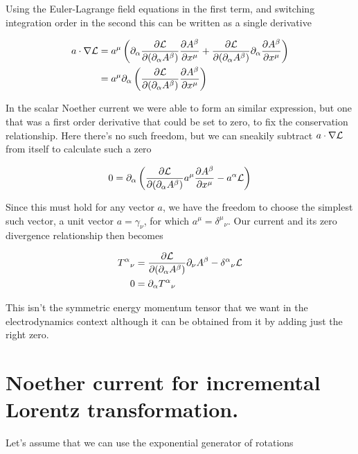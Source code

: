 Using the Euler-Lagrange field equations in the first term, and switching integration order in the second this can be written as a single derivative

\begin{align*}
a \cdot \grad \LL
&=
a^\mu \left(
\partial_\alpha \PD{(\partial_\alpha A^\beta)}{\LL} \PD{x^\mu}{A^\beta}
+\PD{(\partial_\alpha A^\beta)}{\LL} \partial_\alpha \PD{x^\mu}{A^\beta}
\right) \\
&=
a^\mu \partial_\alpha \left(
\PD{(\partial_\alpha A^\beta)}{\LL} \PD{x^\mu}{A^\beta}
\right) \\
\end{align*}

In the scalar Noether current we were able to form an similar expression, but one that was a first order derivative that could be set to zero, to fix the conservation relationship.  Here there's no such freedom, but we can sneakily subtract $a \cdot \grad \LL$ from itself to calculate such a zero

\begin{align}\label{eqn:rotationCurrents:goo8}
0 =
\partial_\alpha \left(
\PD{(\partial_\alpha A^\beta)}{\LL} a^\mu \PD{x^\mu}{A^\beta} - a^\alpha \LL
\right) 
\end{align}

Since this must hold for any vector $a$, we have the freedom to choose the simplest such vector, a unit vector $a = \gamma_\nu$, for which $a^\mu = {\delta^\mu}_\nu$.  Our current and its zero divergence relationship then becomes

\begin{align}\label{eqn:rotationCurrents:goo9}
{T^\alpha}_\nu &= \PD{(\partial_\alpha A^\beta)}{\LL} \partial_\nu A^\beta - {\delta^\alpha}_\nu \LL \\
0 &= \partial_\alpha {T^\alpha}_\nu 
\end{align}

This isn't the symmetric energy momentum tensor that we want in the electrodynamics context although it can be obtained from it by adding just the right zero.

\section{Noether current for incremental Lorentz transformation.}

Let's assume that we can use the exponential generator of rotations 

